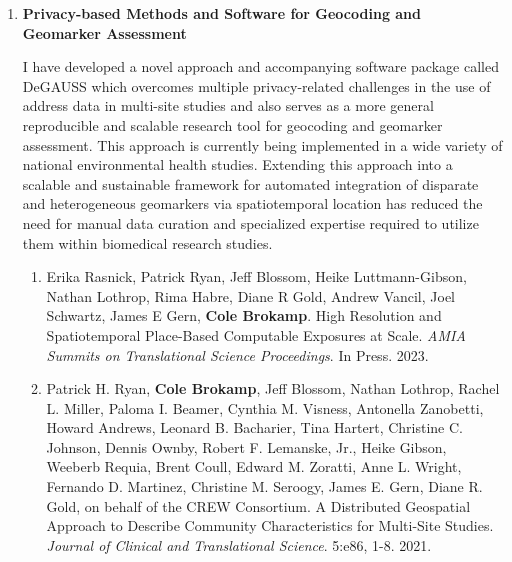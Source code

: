 \documentclass{nihbiosketch}
\begin{document}
\begin{enumerate}
\begin{enumerate}

  \end{enumerate}

\item \textbf{Privacy-based Methods and Software for Geocoding and Geomarker Assessment}

  I have developed a novel approach and accompanying software package called DeGAUSS
  which overcomes multiple privacy-related challenges in the use of address data in
  multi-site studies and also serves as a more general reproducible and scalable
  research tool for geocoding and geomarker assessment. This approach is currently being
  implemented in a wide variety of national environmental health studies. Extending this
  approach into a scalable and sustainable framework for automated integration of
  disparate and heterogeneous geomarkers via spatiotemporal location has reduced
  the need for manual data curation and specialized expertise required
  to utilize them within biomedical research studies.

\begin{enumerate}

  \item Erika Rasnick, Patrick Ryan, Jeff Blossom, Heike Luttmann-Gibson, Nathan Lothrop, 
    Rima Habre, Diane R Gold, Andrew Vancil, Joel Schwartz, James E Gern, \textbf{Cole Brokamp}.
  High Resolution and Spatiotemporal Place-Based Computable Exposures at Scale. \textit{AMIA Summits
    on Translational Science Proceedings}. In Press. 2023.
	
\item Patrick H. Ryan, \textbf{Cole Brokamp}, Jeff Blossom, Nathan Lothrop,
  Rachel L. Miller, Paloma I. Beamer, Cynthia M. Visness, Antonella
  Zanobetti, Howard Andrews, Leonard B. Bacharier, Tina Hartert, Christine
  C. Johnson, Dennis Ownby, Robert F. Lemanske, Jr., Heike Gibson, Weeberb
  Requia, Brent Coull, Edward M. Zoratti, Anne L. Wright, Fernando D.
  Martinez, Christine M. Seroogy, James E. Gern, Diane R. Gold, on behalf
  of the CREW Consortium. A Distributed Geospatial Approach to Describe
  Community Characteristics for Multi-Site Studies. \textit{Journal of
    Clinical and Translational Science}. 5:e86, 1-8. 2021.


\end{enumerate}
\end{enumerate}
\end{document}
